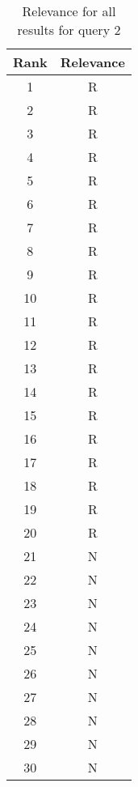 \begin{table}[H]
    \centering
    \begin{tabular}{|c|c|}
    \hline
    \rowcolor[gray]{0.9} Rank & Relevance \\ \hline
    1 & R \\ \hline
2 & R \\ \hline
3 & R \\ \hline
4 & R \\ \hline
5 & R \\ \hline
6 & R \\ \hline
7 & R \\ \hline
8 & R \\ \hline
9 & R \\ \hline
10 & R \\ \hline
11 & R \\ \hline
12 & R \\ \hline
13 & R \\ \hline
14 & R \\ \hline
15 & R \\ \hline
16 & R \\ \hline
17 & R \\ \hline
18 & R \\ \hline
19 & R \\ \hline
20 & R \\ \hline
21 & N \\ \hline
22 & N \\ \hline
23 & N \\ \hline
24 & N \\ \hline
25 & N \\ \hline
26 & N \\ \hline
27 & N \\ \hline
28 & N \\ \hline
29 & N \\ \hline
30 & N \\ \hline

    \end{tabular}
    \caption{Relevance for all results for query 2}
    \label{tab:query2_results}
\end{table}
    


